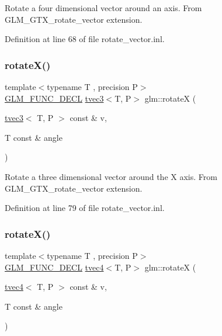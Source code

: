 Rotate a four dimensional vector around an axis. From G\+L\+M\+\_\+\+G\+T\+X\+\_\+rotate\+\_\+vector extension. 

Definition at line 68 of file rotate\+\_\+vector.\+inl.

\mbox{\label{group__gtx__rotate__vector_ga0c2dc9f8507bffcbb957db9818b18508}} 
\subsubsection{\texorpdfstring{rotateX()}{rotateX()}\hspace{0.1cm}{\footnotesize\ttfamily [1/2]}}
{\footnotesize\ttfamily template$<$typename T , precision P$>$ \\
\mbox{\hyperlink{setup_8hpp_ab2d052de21a70539923e9bcbf6e83a51}{G\+L\+M\+\_\+\+F\+U\+N\+C\+\_\+\+D\+E\+CL}} \mbox{\hyperlink{structglm_1_1tvec3}{tvec3}}$<$T, P$>$ glm\+::rotateX (\begin{DoxyParamCaption}\item[{\mbox{\hyperlink{structglm_1_1tvec3}{tvec3}}$<$ T, P $>$ const \&}]{v,  }\item[{T const \&}]{angle }\end{DoxyParamCaption})}

Rotate a three dimensional vector around the X axis. From G\+L\+M\+\_\+\+G\+T\+X\+\_\+rotate\+\_\+vector extension. 

Definition at line 79 of file rotate\+\_\+vector.\+inl.

\mbox{\label{group__gtx__rotate__vector_gadab312d430a564741ae02215255027a0}} 
\subsubsection{\texorpdfstring{rotateX()}{rotateX()}\hspace{0.1cm}{\footnotesize\ttfamily [2/2]}}
{\footnotesize\ttfamily template$<$typename T , precision P$>$ \\
\mbox{\hyperlink{setup_8hpp_ab2d052de21a70539923e9bcbf6e83a51}{G\+L\+M\+\_\+\+F\+U\+N\+C\+\_\+\+D\+E\+CL}} \mbox{\hyperlink{structglm_1_1tvec4}{tvec4}}$<$T, P$>$ glm\+::rotateX (\begin{DoxyParamCaption}\item[{\mbox{\hyperlink{structglm_1_1tvec4}{tvec4}}$<$ T, P $>$ const \&}]{v,  }\item[{T const \&}]{angle }\end{DoxyParamCaption})}

